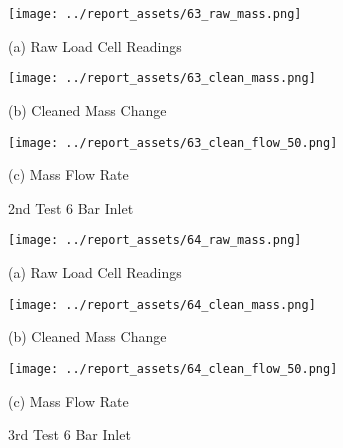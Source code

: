 \vfill
\begin{figure}[htbp]
    \centering

    \begin{minipage}{0.32\textwidth}
        \centering
        \texttt{[image: ../report\_assets/63\_raw\_mass.png]}
        \caption*{(a) Raw Load Cell Readings}
    \end{minipage}
    \hfill
    \begin{minipage}{0.32\textwidth}
        \centering
        \texttt{[image: ../report\_assets/63\_clean\_mass.png]}
        \caption*{(b) Cleaned Mass Change}
    \end{minipage}
    \hfill
    \begin{minipage}{0.32\textwidth}
        \centering
        \texttt{[image: ../report\_assets/63\_clean\_flow\_50.png]}
        \caption*{(c) Mass Flow Rate}
    \end{minipage}
    \caption{2nd Test 6 Bar Inlet}
    
\end{figure}\label{fig:63}

\vfill
\begin{figure}[htbp]
    \centering

    \begin{minipage}{0.32\textwidth}
        \centering
        \texttt{[image: ../report\_assets/64\_raw\_mass.png]}
        \caption*{(a) Raw Load Cell Readings}
    \end{minipage}
    \hfill
    \begin{minipage}{0.32\textwidth}
        \centering
        \texttt{[image: ../report\_assets/64\_clean\_mass.png]}
        \caption*{(b) Cleaned Mass Change}
    \end{minipage}
    \hfill
    \begin{minipage}{0.32\textwidth}
        \centering
        \texttt{[image: ../report\_assets/64\_clean\_flow\_50.png]}
        \caption*{(c) Mass Flow Rate}
    \end{minipage}
    \caption{3rd Test 6 Bar Inlet}
    
\end{figure}\label{fig:64}
\vfill
\newpage

